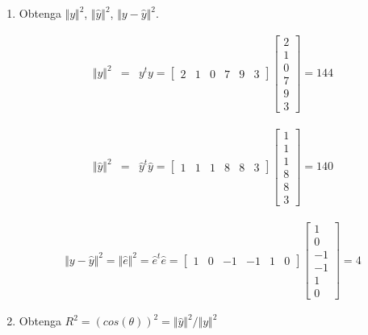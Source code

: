 \documentclass[12pt,a4paper]{report}
\begin{document}
\begin{enumerate}
\begin{enumerate}

\item[5.] Obtenga $\Vert y \Vert ^2$, $\Vert \widehat{y} \Vert ^2$, $\Vert y - \widehat{y} \Vert ^2$.


\begin{eqnarray*}
\Vert y \Vert ^2 &=& y^t y = 
\begin{bmatrix}
2 & 1 & 0 & 7 & 9 & 3
\end{bmatrix}
\begin{bmatrix}
2 \\
1 \\
0 \\
7 \\
9 \\
3
\end{bmatrix} = 144
\end{eqnarray*}

\begin{eqnarray*}
\Vert \widehat{y} \Vert ^2 &=& \widehat{y}^t \widehat{y} = 
\begin{bmatrix}
1 & 1 & 1 & 8 & 8 & 3
\end{bmatrix}
\begin{bmatrix}
1 \\
1 \\
1 \\
8 \\
8 \\
3
\end{bmatrix} = 140
\end{eqnarray*}

\begin{eqnarray*}
\Vert y - \widehat{y} \Vert ^2 = \Vert \widehat{e}\Vert^2 = \widehat{e}^t \widehat{e} =
\begin{bmatrix}
1 & 0 & -1 & -1 & 1 & 0
\end{bmatrix}
\begin{bmatrix}
1 \\
0 \\
-1 \\
-1 \\
1 \\
0
\end{bmatrix} = 4
\end{eqnarray*}


\item[6.] Obtenga $R^2 = (cos(\theta))^2 = \Vert \widehat{y} \Vert ^2/\Vert y \Vert ^2$


\end{enumerate}
\end{enumerate}
\end{document}
